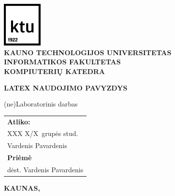 \begin{titlepage}

\newcommand{\universitetas}{Kauno technologijos universitetas}
\newcommand{\fakultetas}{Informatikos fakultetas}
\newcommand{\katedra}{Kompiuterių katedra}
\newcommand{\pavadinimas}{LaTeX naudojimo pavyzdys}
\newcommand{\tipas}{(ne)Laboratorinis darbas}
\newcommand{\grupe}{XXX X/X~}
\newcommand{\atliko}{Vardenis Pavardenis}
\newcommand{\prieme}{dėst. Vardenis Pavardenis}
\newcommand{\miestas}{Kaunas}
\newcommand{\metai}{\the\year}

\renewcommand{\headrulewidth}{0pt}

    \onehalfspacing
	\center
	\includegraphics[width=20mm]{KTU logotype_RGB_without text_BLACK} \\
    \LARGE\textbf{\MakeUppercase{\universitetas}} \\ [5mm]
    \Large\textbf{\MakeUppercase{\fakultetas}} \\ [5mm]	
    \large\textbf{\MakeUppercase{\katedra}} \vfill
	{\fontsize{22}{26}\centering\bfseries\MakeUppercase{\pavadinimas}\par} \vfill
    {\centering \Large \tipas} \vfill
    
	\flushright	
	{\center	
		\normalsize
		\begin{tabular}{l}\onehalfspacing	
			\textbf{Atliko:} \\[1.5pt]
			\grupe grupės stud. \\
			\atliko \\[1cm]

			\textbf{Priėmė}\\[1.5pt]
			\prieme
		\end{tabular}
	}
	\vfill
	\center
	\normalsize\textbf{\MakeUppercase{\miestas}, \metai}
\end{titlepage}
